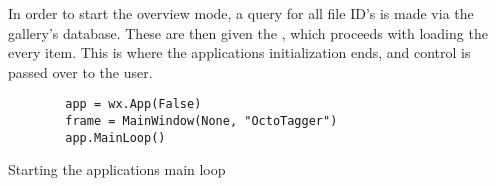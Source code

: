 In order to start the overview mode, a query for all file ID's is made via the gallery's database. These are then given the , which proceeds with loading the every item. This is where the applications initialization ends, and control is passed over to the user.

\begin{listing}[p]
	\begin{verbatim}
		app = wx.App(False)
		frame = MainWindow(None, "OctoTagger")
		app.MainLoop()
	\end{verbatim}
	\caption{Starting the applications main loop}
	\label{lst:mod:mainloop}
\end{listing}